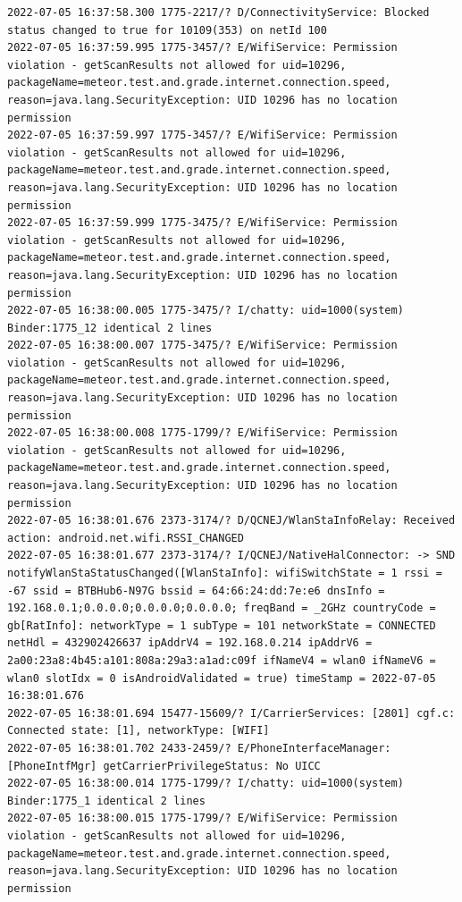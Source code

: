 \documentclass[a4paper,12pt]{book}
\begin{document}
\begin{lstlisting}
2022-07-05 16:37:58.300 1775-2217/? D/ConnectivityService: Blocked status changed to true for 10109(353) on netId 100
2022-07-05 16:37:59.995 1775-3457/? E/WifiService: Permission violation - getScanResults not allowed for uid=10296, packageName=meteor.test.and.grade.internet.connection.speed, reason=java.lang.SecurityException: UID 10296 has no location permission
2022-07-05 16:37:59.997 1775-3457/? E/WifiService: Permission violation - getScanResults not allowed for uid=10296, packageName=meteor.test.and.grade.internet.connection.speed, reason=java.lang.SecurityException: UID 10296 has no location permission
2022-07-05 16:37:59.999 1775-3475/? E/WifiService: Permission violation - getScanResults not allowed for uid=10296, packageName=meteor.test.and.grade.internet.connection.speed, reason=java.lang.SecurityException: UID 10296 has no location permission
2022-07-05 16:38:00.005 1775-3475/? I/chatty: uid=1000(system) Binder:1775_12 identical 2 lines
2022-07-05 16:38:00.007 1775-3475/? E/WifiService: Permission violation - getScanResults not allowed for uid=10296, packageName=meteor.test.and.grade.internet.connection.speed, reason=java.lang.SecurityException: UID 10296 has no location permission
2022-07-05 16:38:00.008 1775-1799/? E/WifiService: Permission violation - getScanResults not allowed for uid=10296, packageName=meteor.test.and.grade.internet.connection.speed, reason=java.lang.SecurityException: UID 10296 has no location permission
2022-07-05 16:38:01.676 2373-3174/? D/QCNEJ/WlanStaInfoRelay: Received action: android.net.wifi.RSSI_CHANGED
2022-07-05 16:38:01.677 2373-3174/? I/QCNEJ/NativeHalConnector: -> SND notifyWlanStaStatusChanged([WlanStaInfo]: wifiSwitchState = 1 rssi = -67 ssid = BTBHub6-N97G bssid = 64:66:24:dd:7e:e6 dnsInfo = 192.168.0.1;0.0.0.0;0.0.0.0;0.0.0.0; freqBand = _2GHz countryCode = gb[RatInfo]: networkType = 1 subType = 101 networkState = CONNECTED netHdl = 432902426637 ipAddrV4 = 192.168.0.214 ipAddrV6 = 2a00:23a8:4b45:a101:808a:29a3:a1ad:c09f ifNameV4 = wlan0 ifNameV6 = wlan0 slotIdx = 0 isAndroidValidated = true) timeStamp = 2022-07-05 16:38:01.676
2022-07-05 16:38:01.694 15477-15609/? I/CarrierServices: [2801] cgf.c: Connected state: [1], networkType: [WIFI]
2022-07-05 16:38:01.702 2433-2459/? E/PhoneInterfaceManager: [PhoneIntfMgr] getCarrierPrivilegeStatus: No UICC
2022-07-05 16:38:00.014 1775-1799/? I/chatty: uid=1000(system) Binder:1775_1 identical 2 lines
2022-07-05 16:38:00.015 1775-1799/? E/WifiService: Permission violation - getScanResults not allowed for uid=10296, packageName=meteor.test.and.grade.internet.connection.speed, reason=java.lang.SecurityException: UID 10296 has no location permission

\end{lstlisting}
\end{document}
